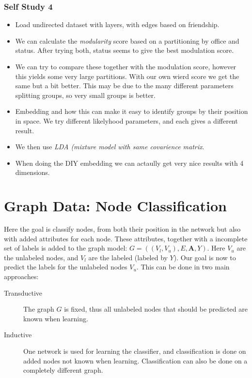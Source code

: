 \subsubsection{Self Study 4}

\begin{itemize}
    \item Load undirected dataset with layers, with edges based on friendship.
    \item We can calculate the \emph{modularity} score based on a partitioning by office and status.
        After trying both, status seems to give the best modulation score.
    \item We can try to compare these together with the modulation score, however this yields some very large partitions.
        With our own wierd score we get the same but a bit better.
        This may be due to the many different parameters splitting groups, so very small groups is better.
    \item Embedding and how this can make it easy to identify groups by their position in space.
        We try different likelyhood parameters, and each gives a different result.
    \item We then use \emph{LDA (mixture model with same covarience matrix}.
    \item When doing the DIY embedding we can actaully get very nice results with 4 dimensions.
\end{itemize}

\section{Graph Data: Node Classification}

Here the goal is classify nodes, from both their position in the network but also with added attributes for each node.
These attributes, together with a incomplete set of labels is added to the graph model: $G = ((V_l, V_u), E, \mathbf{A}, Y)$.
Here $V_u$ are the unlabeled nodes, and $V_l$ are the labeled (labeled by $Y$).
Our goal is now to predict the labels for the unlabeled nodes $V_u$.
This can be done in two main approaches:
\begin{description}
    \item[Transductive] The graph $G$ is fixed, thus all unlabeled nodes that should be predicted are known when learning.
    \item[Inductive] One network is used for learning the classifier, and classification is done on added nodes not known when learning.
        Classification can also be done on a completely different graph.
\end{description}

